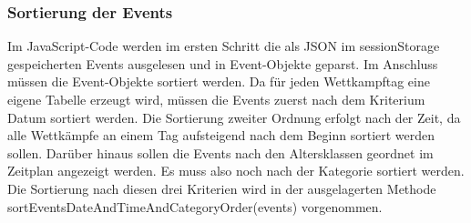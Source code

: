 {\subsubsection{Sortierung der Events}
Im JavaScript-Code werden im ersten Schritt die als JSON im sessionStorage gespeicherten Events ausgelesen und in Event-Objekte geparst. Im Anschluss müssen die Event-Objekte sortiert werden. Da für jeden Wettkampftag eine eigene Tabelle erzeugt wird, müssen die Events zuerst nach dem Kriterium Datum sortiert werden. Die Sortierung zweiter Ordnung erfolgt nach der Zeit, da alle Wettkämpfe an einem Tag aufsteigend nach dem Beginn sortiert werden sollen. Darüber hinaus sollen die Events nach den Altersklassen geordnet im Zeitplan angezeigt werden. Es muss also noch nach der Kategorie sortiert werden. Die Sortierung nach diesen drei Kriterien wird in der ausgelagerten Methode sortEventsDateAndTimeAndCategoryOrder(events) vorgenommen.

}

